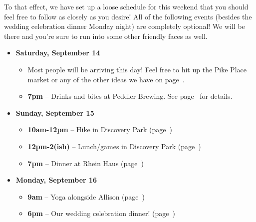 \documentclass[12pt]{article}
\begin{document}
To that effect, we have set up a loose schedule for this weekend that you should 
feel free to follow as closely as you desire! All of the following events
(besides the wedding celebration dinner Monday night) are completely optional! We will be there
and you're sure to run into some other friendly faces as well.

\begin{itemize}[leftmargin=0.25em]
    \item \textbf{Saturday, September 14}
    \begin{itemize}[leftmargin=1em]
        \item Most people will be arriving this day! Feel free to hit up the Pike Place market or 
        any of the other ideas we have on page~\pageref{sec-things-to-do}.
        \item \textbf{7pm} -- Drinks and bites at Peddler Brewing. See page~\pageref{subsec-dinner-sat} for details.
    \end{itemize}
    \item \textbf{Sunday, September 15}
    \begin{itemize}[leftmargin=1em]
        \item \textbf{10am-12pm} -- Hike in Discovery Park (page~\pageref{subsec-discovery})
        \item \textbf{12pm-2(ish)} -- Lunch/games in Discovery Park (page~\pageref{subsec-discovery})
        \item \textbf{7pm} -- Dinner at Rhein Haus (page~\pageref{subsec-rheinhaus})
    \end{itemize}
    \item \textbf{Monday, September 16}
    \begin{itemize}[leftmargin=1em]
        \item \textbf{9am} -- Yoga alongside Allison (page~\pageref{subsec-yoga})
        \item \textbf{6pm} -- Our wedding celebration dinner! (page~\pageref{subsec-wedding})
    \end{itemize}
\end{itemize}




\tableofcontents

\newpage
\end{document}
